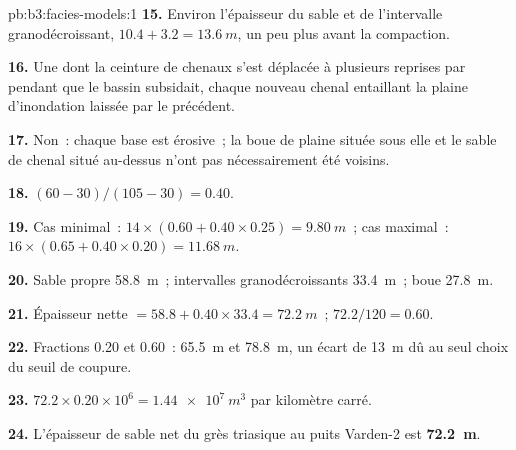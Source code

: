 \begin{solution}{pb:b3:facies-models:1}
\textbf{15.} Environ l'épaisseur du sable et de l'intervalle granodécroissant, $10.4 + 3.2 =
\qty{13.6}{m}$, un peu plus avant la compaction.

\textbf{16.} Une  dont la ceinture de chenaux s'est déplacée à plusieurs reprises
par  pendant que le bassin subsidait, chaque nouveau chenal entaillant la plaine
d'inondation laissée par le précédent.

\textbf{17.} Non~: chaque base est érosive~; la boue de plaine située sous elle et le sable
de chenal situé au-dessus n'ont pas nécessairement été voisins.

\textbf{18.} $(60 - 30)/(105 - 30) = 0.40$.

\textbf{19.} Cas minimal~: $14\times(0.60 + 0.40\times0.25) = \qty{9.80}{m}$~;
cas maximal~: $16\times(0.65 + 0.40\times0.20) = \qty{11.68}{m}$.

\textbf{20.} Sable propre \qty{58.8}{m}~; intervalles granodécroissants \qty{33.4}{m}~; boue
\qty{27.8}{m}.

\textbf{21.} Épaisseur nette $= 58.8 + 0.40\times33.4 = \qty{72.2}{m}$~;  $72.2/120 = 0.60$.

\textbf{22.} Fractions 0.20 et 0.60~: \qty{65.5}{m} et \qty{78.8}{m}, un
écart de \qty{13}{m} dû au seul choix du seuil de coupure.

\textbf{23.} $72.2\times0.20\times10^6 = \qty{1.44e7}{m^3}$ par
kilomètre carré.

\textbf{24.} L'épaisseur de sable net du grès triasique au puits Varden-2 est
\textbf{\qty[text-series-to-math=true]{72.2}{m}}.
\end{solution}
